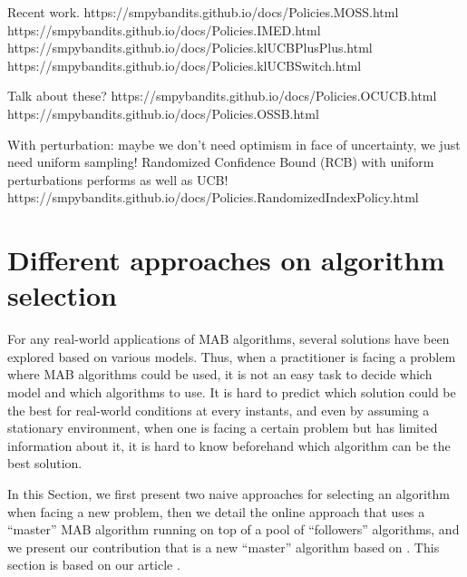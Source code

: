 Recent work.
https://smpybandits.github.io/docs/Policies.MOSS.html
https://smpybandits.github.io/docs/Policies.IMED.html
https://smpybandits.github.io/docs/Policies.klUCBPlusPlus.html
https://smpybandits.github.io/docs/Policies.klUCBSwitch.html

Talk about these?
https://smpybandits.github.io/docs/Policies.OCUCB.html
https://smpybandits.github.io/docs/Policies.OSSB.html

With perturbation: maybe we don't need optimism in face of uncertainty, we just need uniform sampling!
Randomized Confidence Bound (RCB) with uniform perturbations performs as well as UCB!
https://smpybandits.github.io/docs/Policies.RandomizedIndexPolicy.html





\newpage

\section{Different approaches on algorithm selection}
\label{sec:2:chooseYourPreferredBanditAlgorithm}

For any real-world applications of MAB algorithms,
several solutions have been explored based on various models.
Thus, when a practitioner is facing a problem where MAB algorithms could be used, it is not an easy task to decide which model and which algorithms to use.
It is hard to predict which solution could be the best for real-world conditions at every instants,
and even by assuming a stationary environment, when one is facing a certain problem but has limited information about it, it is hard to know beforehand which algorithm can be the best solution.

In this Section, we first present two naive approaches for selecting an algorithm when facing a new problem, then we detail the online approach that uses a ``master'' MAB algorithm running on top of a pool of ``followers'' algorithms, and we present our contribution that is a new ``master'' algorithm based on \ExpQ.
This section is based on our article \cite{Besson2018WCNC}.


